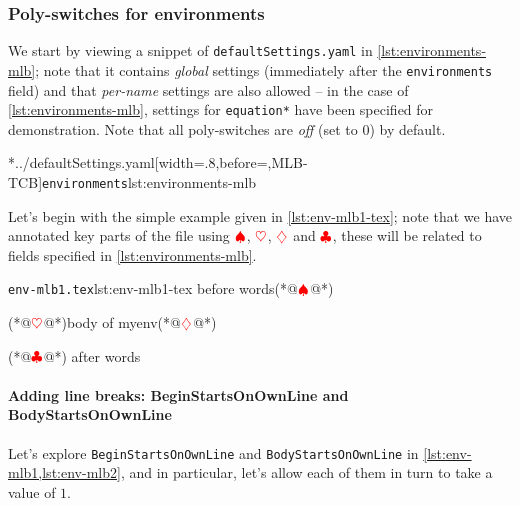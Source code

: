 \subsubsection{Poly-switches for environments}\label{sec:modifylinebreaks-environments}
	We start by viewing a snippet of \texttt{defaultSettings.yaml} in
	\cref{lst:environments-mlb}; note that it contains \emph{global} settings (immediately
	after the \texttt{environments} field) and that \emph{per-name} settings are also allowed
	-- in the case of \cref{lst:environments-mlb}, settings for \texttt{equation*} have been
	specified for demonstration. Note that all poly-switches are \emph{off} (set to 0) by
	default.

	\cmhlistingsfromfile[style=modifylinebreaksEnv]*{../defaultSettings.yaml}[width=.8\linewidth,before=\centering,MLB-TCB]{\texttt{environments}}{lst:environments-mlb}

	Let's begin with the simple example given in \cref{lst:env-mlb1-tex}; note that we have
	annotated key parts of the file using $\color{red}\spadesuit$, $\color{red}\heartsuit$,
	$\color{red}\diamondsuit$ and $\color{red}\clubsuit$, these will be related to fields
	specified in \cref{lst:environments-mlb}.

	\begin{cmhlistings}[style=tcblatex,escapeinside={(*@}{@*)}]{\texttt{env-mlb1.tex}}{lst:env-mlb1-tex}
before words(*@$\color{red}\spadesuit$@*) \begin{myenv}(*@$\color{red}\heartsuit$@*)body of myenv(*@$\color{red}\diamondsuit$@*)\end{myenv}(*@$\color{red}\clubsuit$@*) after words
\end{cmhlistings}

	\paragraph{Adding line breaks: BeginStartsOnOwnLine and BodyStartsOnOwnLine}
		Let's explore \texttt{BeginStartsOnOwnLine} and \texttt{BodyStartsOnOwnLine} in
		\cref{lst:env-mlb1,lst:env-mlb2}, and in particular, let's allow each of them in turn to
		take a value of $1$.

